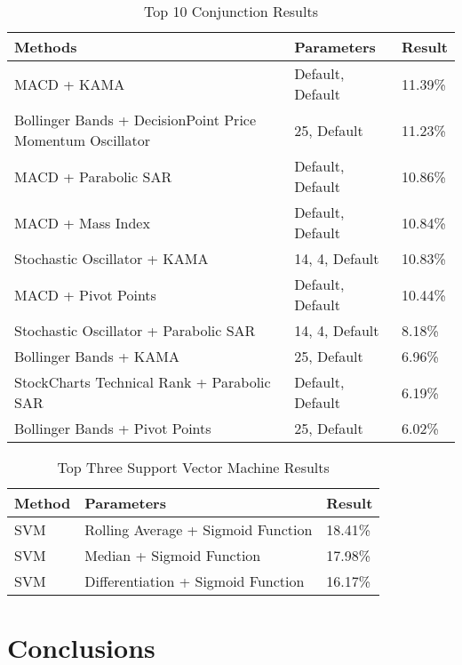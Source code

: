 \documentclass[conference]{IEEEtran}
\begin{document}
\begin{table*}
\centering
\label{units}
\begin{tabu}{ |p{4cm}|p{4cm}|p{4cm}|}\hline\hline
Methods & Parameters & Result \\ \hline
MACD + KAMA & Default, Default & 11.39\% \\ \hline
Bollinger Bands + DecisionPoint Price Momentum Oscillator & 25, Default & 11.23\% \\ \hline
MACD + Parabolic SAR & Default, Default & 10.86\% \\ \hline
MACD + Mass Index & Default, Default & 10.84\% \\ \hline
Stochastic Oscillator + KAMA & 14, 4, Default & 10.83\% \\ \hline
MACD + Pivot Points & Default, Default & 10.44\% \\ \hline
Stochastic Oscillator + Parabolic SAR & 14, 4, Default & 8.18\% \\ \hline
Bollinger Bands + KAMA & 25, Default & 6.96\% \\ \hline
StockCharts Technical Rank + Parabolic SAR & Default, Default & 6.19\% \\ \hline
Bollinger Bands + Pivot Points & 25, Default &  6.02\%\\ \hline
\end{tabu}
\vspace{2 mm}
\caption{Top 10 Conjunction Results}
\end{table*}

\begin{table*}
\centering
\label{units}
\begin{tabu}{ |p{4cm}|p{4cm}|p{4cm}|}\hline\hline
Method & Parameters & Result \\ \hline
SVM & Rolling Average + Sigmoid Function & 18.41\% \\ \hline
SVM & Median + Sigmoid Function & 17.98\% \\ \hline
SVM & Differentiation + Sigmoid Function & 16.17\% \\ \hline
\end{tabu}
\vspace{2 mm}
\caption{Top Three Support Vector Machine Results}
\end{table*}

\iffalse
#################################################################################
\fi

\section{Conclusions}
\end{document}
